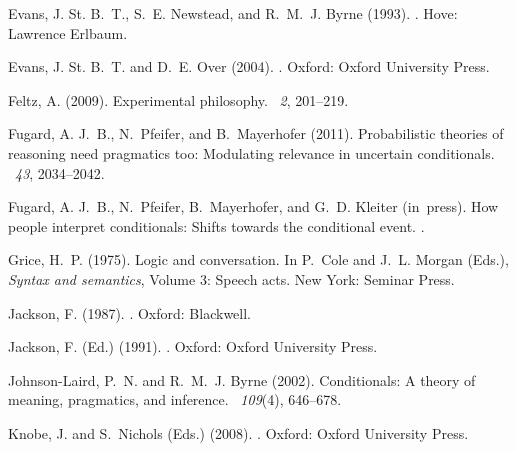 \documentclass[11pt]{article}
\begin{document}
\begin{thebibliography}{}
Evans, J. {\relax St}. B.~T., S.~E. Newstead, and R.~M.~J. Byrne (1993).
.
\newblock Hove: Lawrence Erlbaum.

Evans, J. {\relax St}. B.~T. and D.~E. Over (2004).
.
\newblock Oxford: Oxford University Press.

Feltz, A. (2009).
\newblock Experimental philosophy.
~{\em 2}, 201--219.

Fugard, A. J.~B., N.~Pfeifer, and B.~Mayerhofer (2011).
\newblock Probabilistic theories of reasoning need pragmatics too: {M}odulating
  relevance in uncertain conditionals.
~{\em 43}, 2034--2042.

Fugard, A. J.~B., N.~Pfeifer, B.~Mayerhofer, and G.~D. Kleiter (in~press).
\newblock How people interpret conditionals: {S}hifts towards the conditional
  event.
.

Grice, H.~P. (1975).
\newblock Logic and conversation.
\newblock In P.~Cole and J.~L. Morgan (Eds.), {\em Syntax and semantics},
  Volume 3: Speech acts. New York: Seminar Press.

Jackson, F. (1987).
.
\newblock Oxford: Blackwell.

Jackson, F. (Ed.) (1991).
.
\newblock Oxford: Oxford University Press.

Johnson-Laird, P.~N. and R.~M.~J. Byrne (2002).
\newblock Conditionals: {A} theory of meaning, pragmatics, and inference.
~{\em 109\/}(4), 646--678.

Knobe, J. and S.~Nichols (Eds.) (2008).
.
\newblock Oxford: Oxford University Press.


\end{thebibliography}
\end{document}
